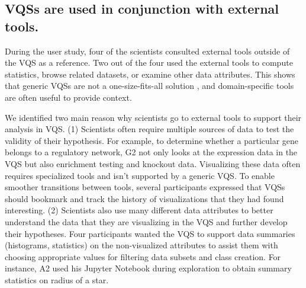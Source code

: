 \subsection{VQSs are used in conjunction with external tools.}
\par During the user study, four of the scientists consulted external tools outside of the VQS as a reference. Two out of the four used the external tools to compute statistics, browse related datasets, or examine other data attributes. This shows that generic VQSs are not a one-size-fits-all solution%
, and domain-specific tools are often useful to provide context.
\par We identified two main reason why scientists go to external tools to support their analysis in VQS. (1) Scientists often require multiple sources of data to test the validity of their hypothesis. For example, to determine whether a particular gene belongs to a regulatory network, G2 not only looks at the expression data in the VQS but also enrichment testing and knockout data. Visualizing these data often requires specialized tools and isn't  supported by a generic VQS. To enable smoother transitions between tools, several participants expressed that VQSs should bookmark and track the history of visualizations that they had found interesting. (2) Scientists also use many different data attributes to better understand the data that they are visualizing in the VQS and further develop their hypotheses. Four participants wanted the VQS to support data summaries (histograms, statistics) on the non-visualized attributes to assist them with choosing appropriate values for filtering data subsets and class creation. For instance, A2 used his Jupyter Notebook during  exploration to obtain summary statistics on radius of a star. 

